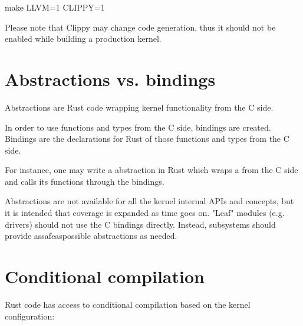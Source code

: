 \documentclass[a4paper,11pt,english]{sphinxmanual}
\begin{document}
\begin{sphinxVerbatim}[commandchars=\\\{\}]
make LLVM=1 CLIPPY=1
\end{sphinxVerbatim}

Please note that Clippy may change code generation, thus it should not be
enabled while building a production kernel.


\section{Abstractions vs. bindings}
\label{\detokenize{general-information:abstractions-vs-bindings}}
Abstractions are Rust code wrapping kernel functionality from the C side.

In order to use functions and types from the C side, bindings are created.
Bindings are the declarations for Rust of those functions and types from
the C side.

For instance, one may write a  abstraction in Rust which wraps
a  from the C side and calls its functions through the bindings.

Abstractions are not available for all the kernel internal APIs and concepts,
but it is intended that coverage is expanded as time goes on. "Leaf" modules
(e.g. drivers) should not use the C bindings directly. Instead, subsystems
should provide as\sphinxhyphen{}safe\sphinxhyphen{}as\sphinxhyphen{}possible abstractions as needed.


\section{Conditional compilation}
\label{\detokenize{general-information:conditional-compilation}}
Rust code has access to conditional compilation based on the kernel
configuration:

\begin{sphinxVerbatim}[commandchars=\\\{\}]
\PYG{c+cp}{\PYGZsh{}[}\PYG{c+cp}{]}
\PYG{c+cp}{\PYGZsh{}[}\PYG{c+cp}{]}
\PYG{c+cp}{\PYGZsh{}[}\PYG{c+cp}{]}
\PYG{c+cp}{\PYGZsh{}[}\PYG{c+cp}{]}
\end{sphinxVerbatim}
\end{document}

